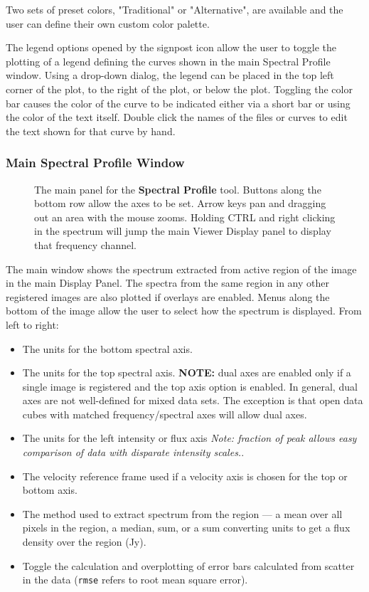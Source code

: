 Two sets of preset colors, "Traditional" or "Alternative", are available and the user can define
their own custom color palette.

The legend options opened by the signpost icon allow the user to toggle the plotting of
a legend defining the curves shown in the main Spectral Profile window. Using a drop-down 
dialog, the legend can be placed in the top left corner of the plot, to the right of the plot, or below the plot. 
Toggling the color bar causes the color of the curve to be indicated either via a short bar or using
the color of the text itself. Double click the names of the files or curves to edit the text shown for that curve 
by hand.

\subsubsection{Main Spectral Profile Window}
\label{section:display.image.specprof.mainwindow}

\begin{figure}[h!]
\begin{center}
\caption{\label{fig:viewer_specmain} The main panel for the {\bf Spectral Profile} tool. Buttons along
the bottom row allow the axes to be set. Arrow keys pan and dragging out an area with the mouse zooms.
Holding CTRL and right clicking in the spectrum will jump the main Viewer Display panel to display that
frequency channel.}
\hrulefill
\end{center}
\end{figure}

The main window shows the spectrum extracted from active region of the image in the 
main Display Panel. The spectra from the same region in any other registered images are also plotted 
if overlays are enabled.  Menus along the bottom of the image allow the user to select how the spectrum 
is displayed. From left to right:

\begin{itemize}
\item The units for the bottom spectral axis.
\item The units for the top spectral axis. {\bf NOTE:} dual axes are enabled only if a single image 
is registered and the top axis option is enabled. In general, dual axes are not well-defined for mixed data sets. The
exception is that open data cubes with matched frequency/spectral axes will allow dual axes.
\item The units for the left intensity or flux axis {\em Note: fraction of peak allows easy comparison of data
with disparate intensity scales.}.
\item The velocity reference frame used if a velocity axis is chosen for the top or bottom axis.
\item The method used to extract spectrum from the region --- a mean over all pixels in the region, a median,
sum, or a sum converting units to get a flux density over the region (Jy).
\item Toggle the calculation and overplotting of error bars calculated from scatter in the data ({\tt rmse} refers
to root mean square error).
\end{itemize}

